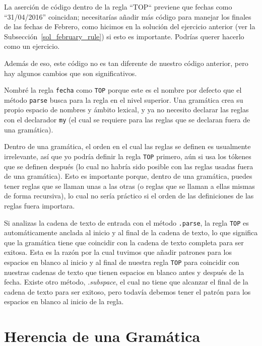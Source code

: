La aserción de código dentro de la regla ``TOP`` previene que 
fechas como ``31/04/2016'' coincidan; necesitarías añadir más
código para manejar los finales de las fechas de Febrero, 
como hicimos en la solución del ejercicio anterior (ver
la Subsección~\ref{sol_february_rule}) si esto es importante. 
Podrías querer hacerlo como un ejercicio.

Además de eso, este código no es tan diferente de nuestro
código anterior, pero hay algunos cambios que son significativos.


Nombré la regla {\tt fecha} como {\tt TOP} porque este
es el nombre por defecto que el método {\tt parse} busca
para la regla en el nivel superior. Una gramática crea su 
propio espacio de nombres y ámbito lexical, y ya no necesito
declarar las reglas con el declarador {\tt my} (el cual se 
requiere para las reglas que se declaran fuera de una 
gramática).

Dentro de una gramática, el orden en el cual las reglas
se definen es usualmente irrelevante, así que yo podría 
definir la regla {\tt TOP} primero, aún si usa los tókenes
que se definen después (lo cual no habría sido posible con las
reglas usadas fuera de una gramática). Esto es importante 
porque, dentro de una gramática, puedes tener reglas que se llaman
unas a las otras (o reglas que se llaman a ellas mismas de forma
recursiva), lo cual no sería práctico si el orden de las definiciones
de las reglas fuera importara.


Si analizas la cadena de texto de entrada con el método
{\tt .parse}, la regla {\tt TOP} es automáticamente anclada
al inicio y al final de la cadena de texto, lo que significa que
la gramática tiene que coincidir con la cadena de texto 
completa para ser exitosa. Esta es la razón por la cual
tuvimos que añadir patrones para los espacios en blanco al
inicio y al final de nuestra regla {\tt TOP} para coincidir 
con nuestras cadenas de texto que tienen espacios en blanco
antes y después de la fecha. Existe otro método, \emph{.subspace},
el cual no tiene que alcanzar el final de la cadena de texto
para ser exitoso, pero todavía debemos tener el patrón 
para los espacios en blanco al inicio de la regla.

\section{Herencia de una Gramática}


